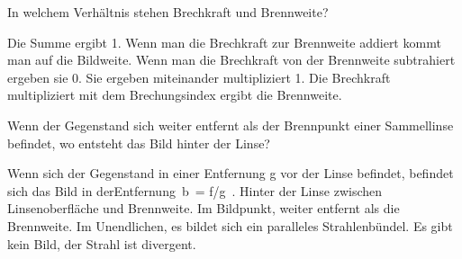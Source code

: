\documentclass[11pt]{exam}
\begin{document}
\begin{questions}
\vspace{3mm}\question In welchem Verhältnis stehen Brechkraft und Brennweite?

\begin{choices}
	\choice Die Summe ergibt 1.
	\choice Wenn man die Brechkraft zur Brennweite addiert kommt man auf die Bildweite.
	\choice Wenn man die Brechkraft von der Brennweite subtrahiert ergeben sie 0.
	\choice Sie ergeben miteinander multipliziert 1.
	\choice Die Brechkraft multipliziert mit dem Brechungsindex ergibt die Brennweite.
\end{choices}

\vspace{3mm}\question Wenn der Gegenstand sich weiter entfernt als der Brennpunkt einer Sammellinse befindet, wo entsteht das Bild hinter der Linse?

\begin{choices}
	\choice Wenn sich der Gegenstand in einer Entfernung g vor der Linse befindet, befindet sich das Bild in derEntfernung b = f/g .
	\choice Hinter der Linse zwischen Linsenoberfläche und Brennweite.
	\choice Im Bildpunkt, weiter entfernt als die Brennweite.
	\choice Im Unendlichen, es bildet sich ein paralleles Strahlenbündel.
	\choice Es gibt kein Bild, der Strahl ist divergent.
\end{choices}

\vspace{3mm}\end{questions}
\end{document}
